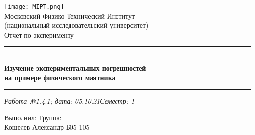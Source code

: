\documentclass[12pt,a4paper]{scrartcl}
\begin{document}
	\graphicspath{{C:/Users/Alex/OneDrive/Изображения/TexImgs}}
	
	\newcommand{\ms}{\mathstrut}
	\newcommand{\msp}{\hspace{0.5cm}}
	\newcommand{\al}{\alpha}
	\newcommand{\dg}{^\circ}
	\newcommand{\qd}[2]{^{\frac{#1}{#2}}}
	\newcommand{\qdm}[2]{^{-\frac{#1}{#2}}}
	\newcommand{\lm}[2]{\underset{#1 \rightarrow #2}{\lim}}
	\newcommand{\sfrac}[2]{\dfrac{\strut #1}{\strut #2}}
	\newcommand{\equal}[1]{\overset{(#1)}{=}}
	\newcommand{\linevdots}{\ \raisebox{-.08\height}{\vdots}\ }
	\newcommand{\linecvdots}{\ \raisebox{-.08\height}{\vdots}\hspace{-0.13cm}\raisebox{.15\height}{\cancel{\phantom{a}}\hspace{0.06cm}}}
	\newcommand{\combox}[1]{\ms \msp \msp \begin{minipage}{0.95\linewidth}
			#1
	\end{minipage}}
	
	\newtheorem{pr}{Задача}
	\newtheorem{ex}{Пример}
	\newtheorem{dfn}{Def}
	\newtheorem{theorem}{Th}
	
	\newenvironment{slv}{\ms \msp \textit{Решение:}}{}
	\newenvironment{proof}{\ms \msp \textit{Доказательство: }}{\hfill $\square$}
	
	\begin{titlepage}
		
		\vspace*{\fill}
		
		\begin{center}
			\texttt{[image: MIPT.png]}
			\\[0.7cm]\Huge Московский Физико-Технический Институт\\(национальный исследовательский университет)
			\\[2cm]\LARGE Отчет по эксперименту
			\\[0.5cm]\noindent\rule{\textwidth}{1pt}
			\\\Huge\textbf{Изучение экспериментальных погрешностей\\на примере физического маятника}
			\\[-0.5cm]\noindent\rule{\textwidth}{1pt}
		\end{center}
		
		\begin{flushleft}
			\textit{Работа №1.4.1; дата: 05.10.21}\hfill\textit{Семестр: 1}
		\end{flushleft}
		
		\vspace*{\fill}
		
		\begin{flushleft}
			Выполнил: \hspace{\fill} Группа:
			\\Кошелев Александр \hspace{\fill} Б05-105
		\end{flushleft}
	\end{titlepage}
	
\end{document}
